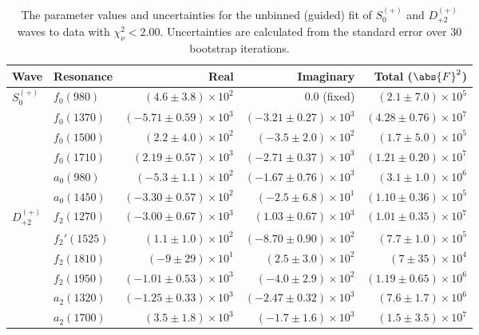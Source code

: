 \begin{table}[ht]
    \begin{center}
        \begin{tabular}{llrrr}\toprule
        Wave & Resonance & Real & Imaginary & Total ($\abs{F}^2$) \\\midrule
$S_{0}^{(+)}$ & $f_{0}(980)$ & $(4.6 \pm 3.8) \times 10^{2}$ & $0.0$ (fixed) & $(2.1 \pm 7.0) \times 10^{5}$ \\
 & $f_{0}(1370)$ & $(-5.71 \pm 0.59) \times 10^{3}$ & $(-3.21 \pm 0.27) \times 10^{3}$ & $(4.28 \pm 0.76) \times 10^{7}$ \\
 & $f_{0}(1500)$ & $(2.2 \pm 4.0) \times 10^{2}$ & $(-3.5 \pm 2.0) \times 10^{2}$ & $(1.7 \pm 5.0) \times 10^{5}$ \\
 & $f_{0}(1710)$ & $(2.19 \pm 0.57) \times 10^{3}$ & $(-2.71 \pm 0.37) \times 10^{3}$ & $(1.21 \pm 0.20) \times 10^{7}$ \\
 & $a_{0}(980)$ & $(-5.3 \pm 1.1) \times 10^{2}$ & $(-1.67 \pm 0.76) \times 10^{3}$ & $(3.1 \pm 1.0) \times 10^{6}$ \\
 & $a_{0}(1450)$ & $(-3.30 \pm 0.57) \times 10^{2}$ & $(-2.5 \pm 6.8) \times 10^{1}$ & $(1.10 \pm 0.36) \times 10^{5}$ \\
$D_{+2}^{(+)}$ & $f_{2}(1270)$ & $(-3.00 \pm 0.67) \times 10^{3}$ & $(1.03 \pm 0.67) \times 10^{3}$ & $(1.01 \pm 0.35) \times 10^{7}$ \\
 & $f_{2}'(1525)$ & $(1.1 \pm 1.0) \times 10^{2}$ & $(-8.70 \pm 0.90) \times 10^{2}$ & $(7.7 \pm 1.0) \times 10^{5}$ \\
 & $f_{2}(1810)$ & $(-9 \pm 29) \times 10^{1}$ & $(2.5 \pm 3.0) \times 10^{2}$ & $(7 \pm 35) \times 10^{4}$ \\
 & $f_{2}(1950)$ & $(-1.01 \pm 0.53) \times 10^{3}$ & $(-4.0 \pm 2.9) \times 10^{2}$ & $(1.19 \pm 0.65) \times 10^{6}$ \\
 & $a_{2}(1320)$ & $(-1.25 \pm 0.33) \times 10^{3}$ & $(-2.47 \pm 0.32) \times 10^{3}$ & $(7.6 \pm 1.7) \times 10^{6}$ \\
 & $a_{2}(1700)$ & $(3.5 \pm 1.8) \times 10^{3}$ & $(-1.7 \pm 1.6) \times 10^{3}$ & $(1.5 \pm 3.5) \times 10^{7}$ \\\bottomrule
        \end{tabular}
    \caption{The parameter values and uncertainties for the unbinned (guided) fit of $S_{0}^{(+)}$ and $D_{+2}^{(+)}$ waves to data with $\chi^2_\nu < 2.00$. Uncertainties are calculated from the standard error over $30$ bootstrap iterations.}\label{tab:unbinned-fit-chisqdof-2.0-guided-Sp0p-Dp2p}
    \end{center}
\end{table}
